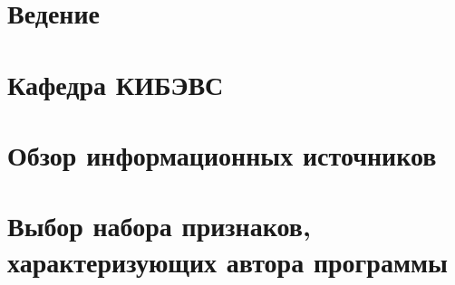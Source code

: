 


 
%  
 
%  
 
 \newpage
 \tableofcontents

% 


\titleformat{\section}{\centering\normalfont\normalsize}{\thesection}{1.0em}{}
\titleformat{\subsection}{\centering\normalfont\normalsize}{\thesubsection}{1.0em}{}
\titleformat{\subsubsection}{\centering\normalfont\normalsize}{\thesubsection}{1.0em}{}


\newpage
{}
\setcounter{section}{0}
\section*{Ведение}


\newpage
\section{Кафедра КИБЭВС}



\newpage 
\section{Обзор информационных источников }


% 
% 

\newpage 
\section{Выбор набора признаков, характеризующих автора программы}\label{features}
 
 
